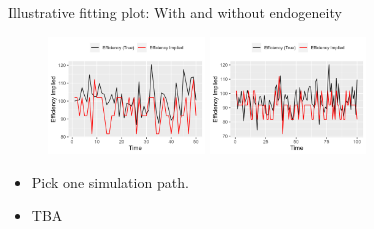 \documentclass[aspectratio=169]{beamer}
\begin{document}
\begin{frame}{Illustrative fitting plot: With and without endogeneity}
\begin{figure}[!ht]
  \begin{center}

  \includegraphics[width = 0.37\textwidth]
  {figuretable/illustrative_plot_implied_efficiency_num_time_50_cobb_douglas_0.3_AR1_I0.png}
  \includegraphics[width = 0.37\textwidth]
  {figuretable/illustrative_plot_implied_efficiency_num_time_100_cobb_douglas_0.3_AR1_I0.png}
  \end{center}
  \footnotesize
\end{figure} 
\begin{itemize}
    \item Pick one simulation path.
    \item TBA
\end{itemize}
\end{frame}

    
\end{document}
